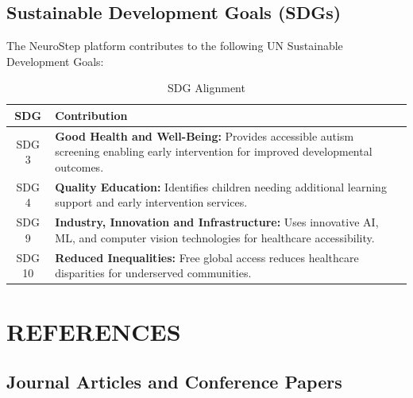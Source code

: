 \documentclass[12pt,letterpaper]{article}
\begin{document}
\subsection*{Sustainable Development Goals (SDGs)}

The NeuroStep platform contributes to the following UN Sustainable Development Goals:

\begin{table}[H]
\centering
\begin{tabular}{|c|p{10cm}|}
\hline
\textbf{SDG} & \textbf{Contribution} \\
\hline
SDG 3 & \textbf{Good Health and Well-Being:} Provides accessible autism screening enabling early intervention for improved developmental outcomes. \\
\hline
SDG 4 & \textbf{Quality Education:} Identifies children needing additional learning support and early intervention services. \\
\hline
SDG 9 & \textbf{Industry, Innovation and Infrastructure:} Uses innovative AI, ML, and computer vision technologies for healthcare accessibility. \\
\hline
SDG 10 & \textbf{Reduced Inequalities:} Free global access reduces healthcare disparities for underserved communities. \\
\hline
\end{tabular}
\caption{SDG Alignment}
\end{table}

\newpage


\section*{REFERENCES}

\subsection*{Journal Articles and Conference Papers}
\end{document}
